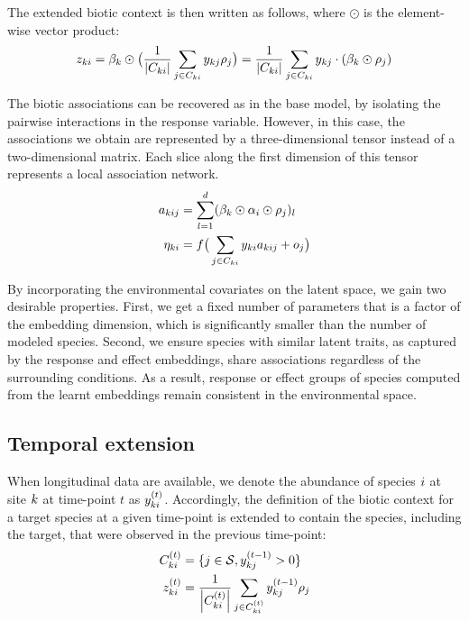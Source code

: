 \documentclass[10pt,a4paper]{article}
\begin{document}
The extended biotic context is then written as follows, where $\odot$ is the element-wise vector product: 
\begin{equation*}
  z_{ki} = \beta_{k} \odot \big(\frac{1}{\left\lvert C_{ki}\right\rvert} \sum_{j \in C_{ki}} y_{kj} \rho_{j} \big)
  = \frac{1}{\left\lvert C_{ki}\right\rvert} \sum_{j \in C_{ki}} y_{kj} \cdot (\beta_{k} \odot \rho_{j}) 
\end{equation*}

The biotic associations can be recovered as in the base model, by isolating the pairwise interactions in the response variable. However, in this case, the associations we obtain are represented by a three-dimensional tensor instead of a two-dimensional matrix. Each slice along the first dimension of this tensor represents a local association network.
\begin{align*}
  a_{kij} &= \sum_{l=1}^{d} (\beta_{k} \odot \alpha_{i} \odot \rho_{j})_l \\
  \eta_{ki} &= f\big( \sum_{j \in C_{ki}} y_{ki}  a_{kij} + o_j\big)
\end{align*}

By incorporating the environmental covariates on the latent space, we gain two desirable properties. First, we get a fixed number of parameters that is a factor of the embedding dimension, which is significantly smaller than the number of modeled species. Second, we ensure species with similar latent traits, as captured by the response and effect embeddings, share associations regardless of the surrounding conditions. As a result, response or effect groups of species computed from the learnt embeddings remain consistent in the environmental space. 

\subsection{Temporal extension}
When longitudinal data are available, we denote the abundance of species $i$ at site $k$ at time-point $t$ as $y_{ki}^{(t)}$. Accordingly, the definition of the biotic context for a target species at a given time-point is extended to contain the species, including the target, that were observed in the previous time-point:
\begin{align*}
  C_{ki}^{(t)} &= \{j \in \mathcal{S}, y_{kj}^{(t-1)} > 0 \} \\
  z_{ki}^{(t)} &= \frac{1}{\left\lvert C_{ki}^{(t)}\right\rvert} \sum_{j \in C_{ki}^{(t)}} y_{kj}^{(t-1)}  \rho_{j}
\end{align*}
\end{document}
